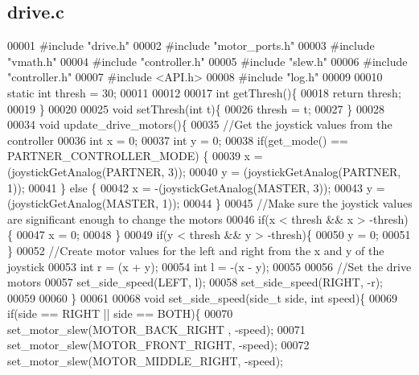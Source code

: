\subsection{drive.\+c}
\label{drive_8c_source}

\begin{DoxyCode}
00001 \textcolor{preprocessor}{#include "drive.h"}
00002 \textcolor{preprocessor}{#include "motor_ports.h"}
00003 \textcolor{preprocessor}{#include "vmath.h"}
00004 \textcolor{preprocessor}{#include "controller.h"}
00005 \textcolor{preprocessor}{#include "slew.h"}
00006 \textcolor{preprocessor}{#include "controller.h"}
00007 \textcolor{preprocessor}{#include <API.h>}
00008 \textcolor{preprocessor}{#include "log.h"}
00009 
00010 \textcolor{keyword}{static} \textcolor{keywordtype}{int} thresh = 30;
00011 
00012 
00017 \textcolor{keywordtype}{int} getThresh()\{
00018   \textcolor{keywordflow}{return} thresh;
00019 \}
00020 
00025 \textcolor{keywordtype}{void} setThresh(\textcolor{keywordtype}{int} t)\{
00026   thresh = t;
00027 \}
00028 
00034 \textcolor{keywordtype}{void} update_drive_motors()\{
00035   \textcolor{comment}{//Get the joystick values from the controller}
00036   \textcolor{keywordtype}{int} x = 0;
00037   \textcolor{keywordtype}{int} y = 0;
00038   \textcolor{keywordflow}{if}(get_mode() == PARTNER_CONTROLLER_MODE) \{
00039     x = (joystickGetAnalog(PARTNER, 3));
00040     y = (joystickGetAnalog(PARTNER, 1));
00041   \} \textcolor{keywordflow}{else} \{
00042     x = -(joystickGetAnalog(MASTER, 3));
00043     y = (joystickGetAnalog(MASTER, 1));
00044   \}
00045   \textcolor{comment}{//Make sure the joystick values are significant enough to change the motors}
00046   \textcolor{keywordflow}{if}(x < thresh && x > -thresh)\{
00047     x = 0;
00048   \}
00049   \textcolor{keywordflow}{if}(y < thresh && y > -thresh)\{
00050     y = 0;
00051   \}
00052   \textcolor{comment}{//Create motor values for the left and right from the x and y of the joystick}
00053   \textcolor{keywordtype}{int} r = (x + y);
00054   \textcolor{keywordtype}{int} l = -(x - y);
00055 
00056   \textcolor{comment}{//Set the drive motors}
00057   set_side_speed(LEFT, l);
00058   set_side_speed(RIGHT, -r);
00059 
00060 \}
00061 
00068 \textcolor{keywordtype}{void} set_side_speed(side_t side, \textcolor{keywordtype}{int} speed)\{
00069   \textcolor{keywordflow}{if}(side == RIGHT || side == BOTH)\{
00070     set_motor_slew(MOTOR_BACK_RIGHT , -speed);
00071     set_motor_slew(MOTOR_FRONT_RIGHT, -speed);
00072     set_motor_slew(MOTOR_MIDDLE_RIGHT, -speed);

\end{DoxyCode}

